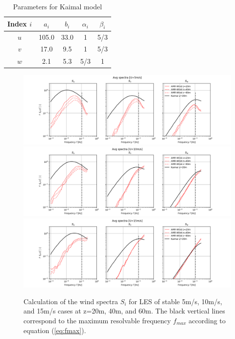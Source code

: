 \begin{table}[h]
\caption{\label{tab:KaimalParameters} Parameters for Kaimal model}
\centering
\begin{tabular}{ccccc}
  \hline
  Index $i$& $a_i$ & $b_i$ & $\alpha_i$  & $\beta_i$ \\
  \hline
  $u$      & 105.0 & 33.0  & 1           & 5/3  \\
  $v$      &  17.0 &  9.5  & 1           & 5/3  \\
  $w$      &   2.1 &  5.3  & 5/3         &   1  \\
\hline
\end{tabular}
\end{table}


\begin{figure}[hbt!]
  \label{fig:ABLSpectra_AllZ}
  \centering
  \includegraphics[width=7.0in]{figures/Stable_Spectra_AllZ_05ms.png}\\
  \includegraphics[width=7.0in]{figures/Stable_Spectra_AllZ_10ms.png}\\
  \includegraphics[width=7.0in]{figures/Stable_Spectra_AllZ_15ms.png}
  \caption{Calculation of the wind spectra $S_i$ for LES of stable
    5m/s, 10m/s, and 15m/s cases at z=20m, 40m, and 60m.  The black
    vertical lines correspond to the maximum resolvable frequency
    $f_{max}$ according to equation (\ref{eq:fmax}). }
\end{figure}


